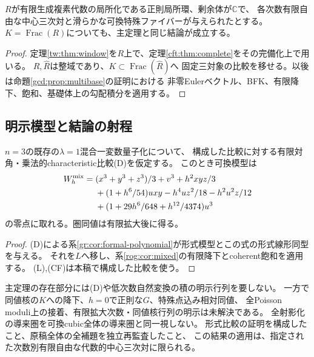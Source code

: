 \begin{corollary}[正則多変数局所基底の一般点]\label{gdr:cor:multibase}
$R$が有限生成複素代数の局所化である正則局所環、剰余体が$\mathbb C$で、
各次数有限自由な中心三次対と滑らかな可換特殊ファイバーが与えられたとする。
$K=\operatorname{Frac}(R)$についても、主定理と同じ結論が成立する。
\end{corollary}
\begin{proof}
定理\ref{tw:thm:window}を$R$上で、定理\ref{cft:thm:complete}をその完備化上で用いる。
$R,\widehat R$は整域であり、$K\subset\operatorname{Frac}(\widehat R)$へ
固定三対象の比較を移せる。以後は命題\ref{gcd:prop:multibase}の証明における
非零Eulerベクトル、BFK、有限降下、飽和、基礎体上の勾配積分を適用する。
\end{proof}

\subsection{明示模型と結論の射程}
\begin{corollary}[五変数混合族の明示的復元]\label{gdr:cor:mixed}
$n=3$の既存の$\lambda=1$混合一変数量子化について、
構成した比較に対する有限対角・乗法的characteristic比較(D)を仮定する。
このとき可換模型は
\begin{equation}\label{gdr:eq:mixed}
\begin{aligned}
 W^{\rm mix}_h={}&(x^3+y^3+z^3)/3+v^3+h^2xyz/3\\
 &+(1+h^6/54)uxy-h^4uz^2/18-h^2u^2z/12\\
 &+(1+29h^6/648+h^{12}/4374)u^3
\end{aligned}
\end{equation}
の零点に取れる。圏同値は有限拡大後に得る。
\end{corollary}
\begin{proof}
(D)による系\ref{gr:cor:formal-polynomial}が形式模型とこの式の形式線形同型を与える。
それを$L$へ移し、系\ref{rog:cor:mixed}の有限降下とcoherent飽和を適用する。
(L),(CF)は本稿で構成した比較を使う。
\end{proof}

主定理の存在部分には(D)や低次数自然変換の積の明示行列を要しない。
一方で同値核の$K$への降下、$h=0$で正則な$G$、特殊点込み相対同値、
全Poisson moduli上の接着、有限拡大次数・同値核行列の明示は未解決である。
全射影化の導来圏を可換cubic全体の導来圏と同一視しない。
形式比較の証明を構成したこと、原稿全体の全補題を独立再監査したこと、
この結果の適用は、指定された次数別有限自由な代数的中心三次対に限られる。
